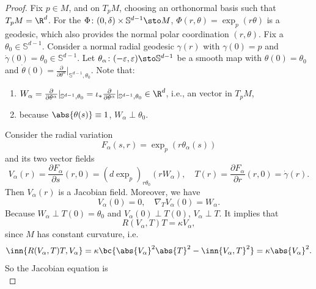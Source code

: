 \begin{proof}
    Fix $p \in M$, and on $T_pM$, choosing an orthonormal basis such that $T_pM = \R^d$. For the  $\Phi \colon (0, \delta) \times \mathbb{S}^{d-1} \sto M$, $\Phi(r,\theta)= \exp_p(r\theta)$ is a geodesic, which also provides the normal polar coordination $(r, \theta)$. Fix a $\theta_0 \in \mathbb{S}^{d-1}$. Consider a normal radial geodesic $\gamma(r)$ with $\gamma(0) = p$ and $\dot{\gamma}(0) = \theta_0 \in \mathbb{S}^{d-1}$. Let $\theta_\alpha \colon (-\varepsilon,\varepsilon) \sto \mathbb{S}^{d-1}$ be a smooth map with $\theta(0) = \theta_0$ and $\dot{\theta}(0) = \frac{\partial}{\partial \theta^\alpha}|_{\mathbb{S}^{d-1},\theta_0}$. Note that:
    \begin{enumerate}[label=(\roman{*})]
        \item $W_\alpha = \frac{\partial}{\partial \theta^\alpha}|_{\mathbb{S}^{d-1},\theta_0} = \iota_*\frac{\partial}{\partial \theta^\alpha}|_{\mathbb{S}^{d-1},\theta_0} \in \R^d$, i.e., an vector in $T_pM$,
        \item because $\abs{\theta(s)} \equiv 1$, $W_\alpha \perp \theta_0$.
    \end{enumerate}
    Consider the radial variation
    \begin{equation*}
        F_\alpha(s,r) = \exp_p(r\theta_\alpha(s))
    \end{equation*}
    and its two vector fields
    \begin{equation*}
        V_\alpha(r) = \frac{\partial F_\alpha}{\partial s}(r,0) = (d\exp_p)_{r\theta_0}(rW_\alpha),\quad T(r) = \frac{\partial F_\alpha}{\partial r}(r,0) = \dot{\gamma}(r).
    \end{equation*}
    Then $V_\alpha(r)$ is a Jacobian field. Moreover, we have
    \begin{equation*}
        V_\alpha(0) = 0,\quad \nabla_TV_\alpha(0) = W_\alpha.
    \end{equation*}
    Because $W_\alpha \perp T(0) = \theta_0$ and $V_\alpha(0) \perp T(0)$, $V_\alpha \perp T$. It implies that
    \begin{equation*}
        R(V_\alpha,T)T = \kappa V_\alpha,
    \end{equation*}
    since $M$ has constant curvature, i.e.
    \begin{equation*}
        \inn{R(V_\alpha,T)T,V_\alpha} = \kappa \bc{\abs{V_\alpha}^2\abs{T}^2 - \inn{V_\alpha, T}^2} = \kappa \abs{V_\alpha}^2.
    \end{equation*}
    So the Jacobian equation is
    \begin{equation*}

\end{equation*}
\end{proof}
